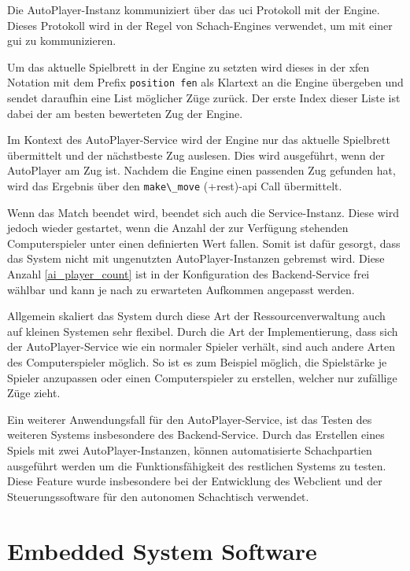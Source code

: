 Die AutoPlayer-Instanz kommuniziert über das \gls{uci}
Protokoll\cite{uciprotocol} mit der Engine. Dieses Protokoll wird in
der Regel von Schach-Engines verwendet, um mit einer \gls{gui} zu
kommunizieren.

Um das aktuelle Spielbrett in der Engine zu setzten wird dieses in der
\gls{xfen} Notation mit dem Prefix
\passthrough{\lstinline!position fen!} als Klartext an die Engine
übergeben und sendet daraufhin eine List möglicher Züge zurück. Der
erste Index dieser Liste ist dabei der am besten bewerteten Zug der
Engine.

Im Kontext des AutoPlayer-Service wird der Engine nur das aktuelle
Spielbrett übermittelt und der nächstbeste Zug auslesen. Dies wird
ausgeführt, wenn der AutoPlayer am Zug ist. Nachdem die Engine einen
passenden Zug gefunden hat, wird das Ergebnis über den
\passthrough{\lstinline!make\_move!} (+rest)-\gls{api} Call übermittelt.

Wenn das Match beendet wird, beendet sich auch die Service-Instanz.
Diese wird jedoch wieder gestartet, wenn die Anzahl der zur Verfügung
stehenden Computerspieler unter einen definierten Wert fallen. Somit ist
dafür gesorgt, dass das System nicht mit ungenutzten
AutoPlayer-Instanzen gebremst wird. Diese Anzahl \ref{ai_player_count}
ist in der Konfiguration des Backend-Service frei wählbar und kann je
nach zu erwarteten Aufkommen angepasst werden.

Allgemein skaliert das System durch diese Art der Ressourcenverwaltung
auch auf kleinen Systemen sehr flexibel. Durch die Art der
Implementierung, dass sich der AutoPlayer-Service wie ein normaler
Spieler verhält, sind auch andere Arten des Computerspieler möglich. So
ist es zum Beispiel möglich, die Spielstärke je Spieler anzupassen oder
einen Computerspieler zu erstellen, welcher nur zufällige Züge zieht.

Ein weiterer Anwendungsfall für den AutoPlayer-Service, ist das Testen
des weiteren Systems insbesondere des Backend-Service. Durch das
Erstellen eines Spiels mit zwei AutoPlayer-Instanzen, können
automatisierte Schachpartien ausgeführt werden um die Funktionsfähigkeit
des restlichen Systems zu testen. Diese Feature wurde insbesondere bei
der Entwicklung des Webclient und der Steuerungssoftware für den
autonomen Schachtisch verwendet.

\hypertarget{embedded-system-software}{%
\chapter{Embedded System Software}\label{embedded-system-software}}

